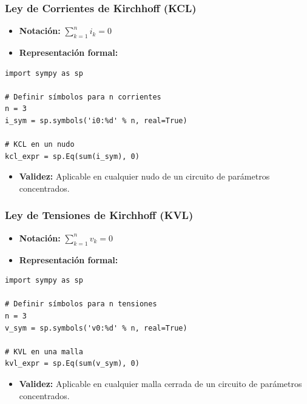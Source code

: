 \documentclass[11pt,a4paper]{article}
\begin{document}
\subsubsection*{Ley de Corrientes de Kirchhoff (KCL)}


\begin{itemize}[leftmargin=*,topsep=2pt,itemsep=1pt]
  \item \textbf{Notación:} $\sum_{k=1}^{n} i_k = 0$
  \item \textbf{Representación formal:}
\end{itemize}


\begin{lstlisting}
import sympy as sp

# Definir símbolos para n corrientes
n = 3
i_sym = sp.symbols('i0:%d' % n, real=True)

# KCL en un nudo
kcl_expr = sp.Eq(sum(i_sym), 0)
\end{lstlisting}


\begin{itemize}[leftmargin=*,topsep=2pt,itemsep=1pt]
  \item \textbf{Validez:} Aplicable en cualquier nudo de un circuito de parámetros concentrados.
\end{itemize}


\subsubsection*{Ley de Tensiones de Kirchhoff (KVL)}


\begin{itemize}[leftmargin=*,topsep=2pt,itemsep=1pt]
  \item \textbf{Notación:} $\sum_{k=1}^{n} v_k = 0$
  \item \textbf{Representación formal:}
\end{itemize}


\begin{lstlisting}
import sympy as sp

# Definir símbolos para n tensiones
n = 3
v_sym = sp.symbols('v0:%d' % n, real=True)

# KVL en una malla
kvl_expr = sp.Eq(sum(v_sym), 0)
\end{lstlisting}


\begin{itemize}[leftmargin=*,topsep=2pt,itemsep=1pt]
  \item \textbf{Validez:} Aplicable en cualquier malla cerrada de un circuito de parámetros concentrados.
\end{itemize}
\end{document}
